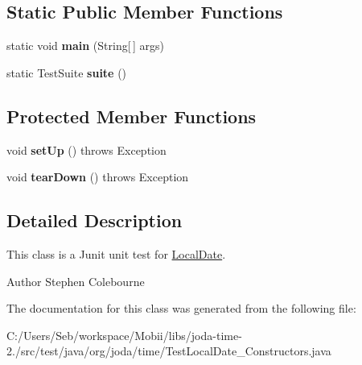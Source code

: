 \subsection*{Static Public Member Functions}
\begin{DoxyCompactItemize}
\item 
\hypertarget{classorg_1_1joda_1_1time_1_1_test_local_date___constructors_a28eb06d0097f1cccad96f7251905e9a7}{static void {\bfseries main} (String\mbox{[}$\,$\mbox{]} args)}\label{classorg_1_1joda_1_1time_1_1_test_local_date___constructors_a28eb06d0097f1cccad96f7251905e9a7}

\item 
\hypertarget{classorg_1_1joda_1_1time_1_1_test_local_date___constructors_ac5735de8f4632a2b34a8ecdf30559655}{static Test\-Suite {\bfseries suite} ()}\label{classorg_1_1joda_1_1time_1_1_test_local_date___constructors_ac5735de8f4632a2b34a8ecdf30559655}

\end{DoxyCompactItemize}
\subsection*{Protected Member Functions}
\begin{DoxyCompactItemize}
\item 
\hypertarget{classorg_1_1joda_1_1time_1_1_test_local_date___constructors_a07efb009cdb9d4f4fe0e30805f1b6fb3}{void {\bfseries set\-Up} ()  throws Exception }\label{classorg_1_1joda_1_1time_1_1_test_local_date___constructors_a07efb009cdb9d4f4fe0e30805f1b6fb3}

\item 
\hypertarget{classorg_1_1joda_1_1time_1_1_test_local_date___constructors_a6669c3885bacd92a0d250ddac861d61d}{void {\bfseries tear\-Down} ()  throws Exception }\label{classorg_1_1joda_1_1time_1_1_test_local_date___constructors_a6669c3885bacd92a0d250ddac861d61d}

\end{DoxyCompactItemize}


\subsection{Detailed Description}
This class is a Junit unit test for \hyperlink{classorg_1_1joda_1_1time_1_1_local_date}{Local\-Date}.

\begin{DoxyAuthor}{Author}
Stephen Colebourne 
\end{DoxyAuthor}


The documentation for this class was generated from the following file\-:\begin{DoxyCompactItemize}
\item 
C\-:/\-Users/\-Seb/workspace/\-Mobii/libs/joda-\/time-\/2./src/test/java/org/joda/time/Test\-Local\-Date\-\_\-\-Constructors.\-java\end{DoxyCompactItemize}
